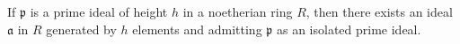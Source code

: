 If $\mathfrak{p}$ is a prime ideal of height $h$ in a noetherian ring $R$, then there exists an ideal $\mathfrak{a}$ in $R$ generated by $h$ elements and admitting $\mathfrak{p}$ as an isolated prime ideal.
